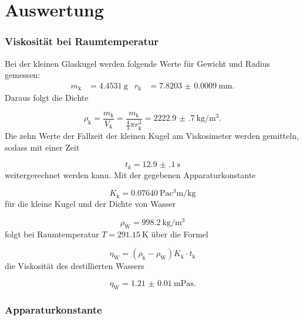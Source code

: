 \section{Auswertung}
\label{sec:Auswertung}

\subsubsection{Viskosität bei Raumtemperatur}

Bei der kleinen Glaskugel werden folgende Werte für Gewicht und Radius
gemessen:
\begin{align}
  m_\text{k} & = \SI{4.4531}{\gram} & r_\text{k} & =
  \SI{7.8203(9)}{\milli\meter}.
\end{align}
Daraus folgt die Dichte

\begin{equation}
  \rho_\text{k} = \frac{m_\text{k}}{V_\text{k}} = \frac{m_\text{k}}
  {\frac{4}{3}\pi r_\text{k}^3} = \SI{2222.9(7)}{\kilo\gram\per\cubic\meter}.
\end{equation}
Die zehn Werte der Fallzeit der kleinen Kugel am Viskosimeter werden gemitteln,
sodass mit einer Zeit

\begin{equation}
  t_{k} = \SI{12.9(1)}{\second}
\end{equation}
weitergerechnet werden kann.
Mit der gegebenen Apparaturkonstante

\begin{equation}
  K_\text{k} = \SI{0.07640}{\pascal\cubic\centi\meter\per\kilo\gram}
\end{equation}
für die kleine Kugel und der Dichte von Wasser \cite{Wasserdichte}

\begin{equation}
  \rho_\text{W} = \SI{998.2}{\kilo\gram\per\cubic\meter}
\end{equation}
folgt bei Raumtemperatur $T=\SI{291.15}{\kelvin}$ über die Formel

\begin{equation}
  \eta_\text{W} = (\rho_\text{k}-\rho_\text{W})K_\text{k} \cdot t_\text{k}
  \label{eqn:Viskositaet}
\end{equation}
die Viskosität des destillierten Wassers

\begin{equation}
  \eta_\text{W} = \SI{1.21(1)}{\milli\pascal\second}.
  \label{eqn:Viskosi}
\end{equation}

\subsubsection{Apparaturkonstante}

